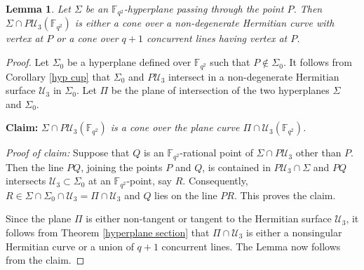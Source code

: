 \documentclass[10pt,a4paper,oneside]{amsproc}
\newtheorem{lemma}[theorem]{Lemma}
\newcommand{\Fqt}{\mathbb{F}_{q^2}}
\newcommand{\U}{\mathcal{U}}
\begin{document}
\begin{lemma}\label{hyperplane cut}
 Let $\Sigma$ be an $\Fqt$-hyperplane passing through the point $P$. Then $\Sigma\cap P\U_3(\Fqt)$ is either a cone over a non-degenerate Hermitian curve with vertex at $P$ or a cone over $q+1$ concurrent lines having vertex at $P$.   
\end{lemma}
\begin{proof}
Let $\Sigma_0$ be a hyperplane defined over $\Fqt$ such that $P\notin \Sigma_0$. It follows from Corollary \ref{hyp cup} that $\Sigma_0$ and $P\U_3$ intersect in a non-degenerate Hermitian surface $\U_3$ in $\Sigma_0$. Let $\Pi$ be the plane of intersection of the two hyperplanes $\Sigma$ and $\Sigma_0$.

\textbf{Claim:} \textit{$\Sigma\cap P\U_3(\Fqt)$ is a cone over the plane curve $\Pi\cap\U_3(\Fqt)$.}

\textit{Proof of claim:} Suppose that $Q$ is an $\Fqt$-rational point of $\Sigma\cap P\U_3$ other than $P$. Then the line $PQ$, joining the points $P$ and $Q$, is contained in $P\U_3\cap \Sigma$ and $PQ$ intersects $\U_3\subset \Sigma_0$ at an $\Fqt$-point, say $R$. Consequently, $R\in \Sigma\cap\Sigma_0\cap\U_3=\Pi\cap\U_3$ and $Q$ lies on the line $PR$. This proves the claim.

 Since the plane $\Pi$ is either non-tangent or tangent to the Hermitian surface $\U_3$, it follows from Theorem \ref{hyperplane section} that $\Pi \cap \U_3$ is either a nonsingular Hermitian curve or a union of $q+1$ concurrent lines. The Lemma now follows from the claim.  
\end{proof}

\end{document}
